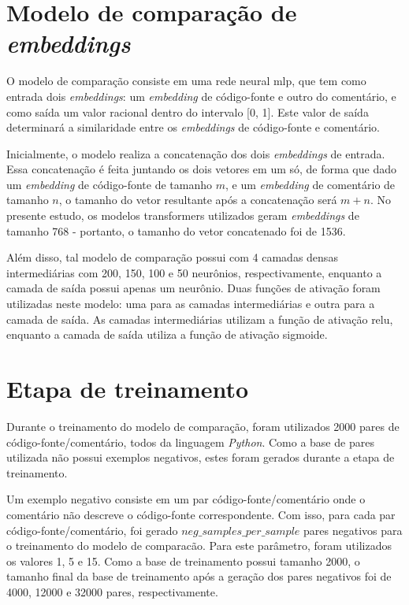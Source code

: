 \section{Modelo de comparação de \textit{embeddings}}
\label{sec:methodology:embedding-comparator}

O modelo de comparação consiste em uma rede neural \gls{mlp}, que tem como entrada dois \textit{embeddings}: um \textit{embedding} de código-fonte e outro do comentário, e como saída um valor racional dentro do intervalo [0, 1]. Este valor de saída determinará a similaridade entre os \textit{embeddings} de código-fonte e comentário.

Inicialmente, o modelo realiza a concatenação dos dois \textit{embeddings} de entrada. Essa concatenação é feita juntando os dois vetores em um só, de forma que dado um \textit{embedding} de código-fonte de tamanho $m$, e um \textit{embedding} de comentário de tamanho $n$, o tamanho do vetor resultante após a concatenação será $m + n$. No presente estudo, os modelos transformers utilizados geram \textit{embeddings} de tamanho 768 - portanto, o tamanho do vetor concatenado foi de 1536.

Além disso, tal modelo de comparação possui com 4 camadas densas intermediárias com 200, 150, 100 e 50 neurônios, respectivamente, enquanto a camada de saída possui apenas um neurônio. Duas funções de ativação foram utilizadas neste modelo: uma para as camadas intermediárias e outra para a camada de saída. As camadas intermediárias utilizam a função de ativação \gls{relu}, enquanto a camada de saída utiliza a função de ativação sigmoide.

\section{Etapa de treinamento}
\label{sec:methodology:embedding-comparator-training}
Durante o treinamento do modelo de comparação, foram utilizados 2000 pares de código-fonte/comentário, todos da linguagem \textit{Python}. Como a base de pares utilizada não possui exemplos negativos, estes foram gerados durante a etapa de treinamento.

Um exemplo negativo consiste em um par código-fonte/comentário onde o comentário não descreve o código-fonte correspondente. Com isso, para cada par código-fonte/comentário, foi gerado $neg\_samples\_per\_sample$ pares negativos para o treinamento do modelo de comparacão. Para este parâmetro, foram utilizados os valores 1, 5 e 15. Como a base de treinamento possui tamanho 2000, o tamanho final da base de treinamento após a geração dos pares negativos foi de 4000, 12000 e 32000 pares, respectivamente.

